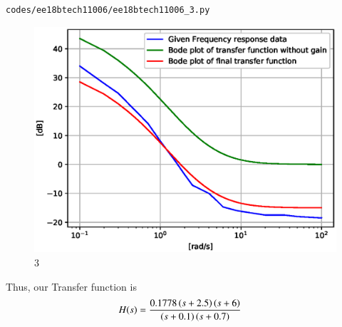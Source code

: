 \begin{lstlisting}
codes/ee18btech11006/ee18btech11006_3.py
\end{lstlisting}
\begin{figure}[!ht]
\centering
\includegraphics[width=\columnwidth]{./figs/ee18btech11006/ee18btech11006_3.eps}
\caption{3}
\label{fig:ee18btech11006_3}
\end{figure}
Thus, our Transfer function is 
\begin{align}
H(s) &= \frac{0.1778\left(s+2.5\right)\left(s+6\right)}{\left(s+0.1\right)\left(s+0.7\right)}  
\end{align}
